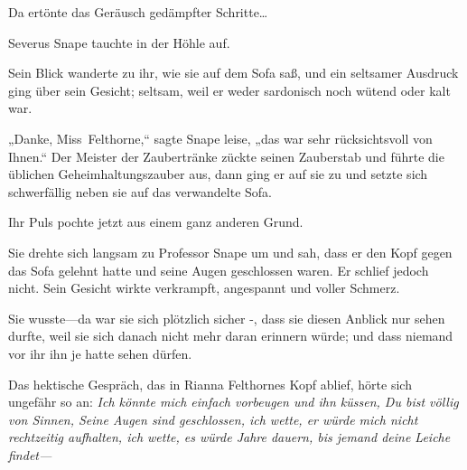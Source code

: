 Da ertönte das Geräusch gedämpfter Schritte…

Severus Snape tauchte in der Höhle auf.

Sein Blick wanderte zu ihr, wie sie auf dem Sofa saß, und ein seltsamer Ausdruck ging über sein Gesicht; seltsam, weil er weder sardonisch noch wütend oder kalt war.

„Danke, Miss~Felthorne,“ sagte Snape leise, „das war sehr rücksichtsvoll von Ihnen.“ Der Meister der Zaubertränke zückte seinen Zauberstab und führte die üblichen Geheimhaltungszauber aus, dann ging er auf sie zu und setzte sich schwerfällig neben sie auf das verwandelte Sofa.

Ihr Puls pochte jetzt aus einem ganz anderen Grund.

Sie drehte sich langsam zu Professor Snape um und sah, dass er den Kopf gegen das Sofa gelehnt hatte und seine Augen geschlossen waren. Er schlief jedoch nicht. Sein Gesicht wirkte verkrampft, angespannt und voller Schmerz.

Sie wusste—da war sie sich plötzlich sicher -, dass sie diesen Anblick nur sehen durfte, weil sie sich danach nicht mehr daran erinnern würde; und dass niemand vor ihr ihn je hatte sehen dürfen.

Das hektische Gespräch, das in Rianna Felthornes Kopf ablief, hörte sich ungefähr so an: \emph{Ich könnte mich einfach vorbeugen und ihn küssen, Du bist völlig von Sinnen, Seine Augen sind geschlossen, ich wette, er würde mich nicht rechtzeitig aufhalten, ich wette, es würde Jahre dauern, bis jemand deine Leiche findet—}

